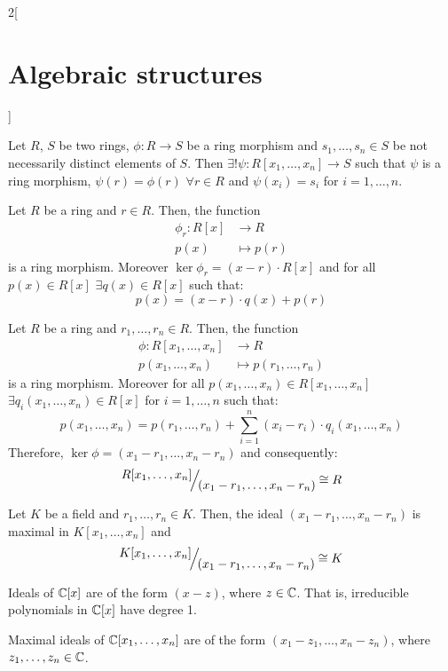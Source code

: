 \documentclass[../../../main.tex]{subfiles}
\begin{document}
\begin{multicols}{2}[\section{Algebraic structures}]
\begin{prop}
  \end{prop}
  \begin{prop}
    Let $R$, $S$ be two rings, $\phi:R\rightarrow S$ be a ring morphism and $s_1,\ldots,s_n\in S$ be not necessarily distinct elements of $S$. Then $\exists!\psi:R[x_1,\ldots,x_n]\rightarrow S$ such that $\psi$ is a ring morphism, $\psi(r)=\phi(r)$ $\forall r\in R$ and $\psi(x_i)=s_i$ for $i=1,\ldots,n$.
  \end{prop}
  \begin{corollary}
    Let $R$ be a ring and $r\in R$. Then, the function
    \begin{align*}
      \phi_r:R[x] & \longrightarrow R \\
      p(x)        & \longmapsto p(r)
    \end{align*}
    is a ring morphism. Moreover $\ker\phi_r=(x-r)\cdot R[x]$ and for all $p(x)\in R[x]$ $\exists q(x)\in R[x]$ such that: $$p(x)=(x-r)\cdot q(x)+p(r)$$
  \end{corollary}
  \begin{corollary}
    Let $R$ be a ring and $r_1,\ldots,r_n\in R$. Then, the function
    \begin{align*}
      \phi:R[x_1,\ldots,x_n] & \longrightarrow R             \\
      p(x_1,\ldots,x_n)      & \longmapsto p(r_1,\ldots,r_n)
    \end{align*}
    is a ring morphism. Moreover for all $p(x_1,\ldots,x_n)\in R[x_1,\ldots,x_n]$ $\exists q_i(x_1,\ldots,x_n)\in R[x]$ for $i=1,\ldots,n$ such that: $$p(x_1,\ldots,x_n)=p(r_1,\ldots,r_n)+\sum_{i=1}^n(x_i-r_i)\cdot q_i(x_1,\ldots,x_n)$$ Therefore, $\ker\phi=(x_1-r_1,\ldots,x_n-r_n)$ and consequently: $$\quot{R[x_1,\ldots,x_n]}{(x_1-r_1,\ldots,x_n-r_n)}\cong R$$
  \end{corollary}
  \begin{corollary}
    Let $K$ be a field and $r_1,\ldots,r_n\in K$. Then, the ideal $(x_1-r_1,\ldots,x_n-r_n)$ is maximal in $K[x_1,\ldots,x_n]$ and $$\quot{K[x_1,\ldots,x_n]}{(x_1-r_1,\ldots,x_n-r_n)}\cong K$$
  \end{corollary}
  \begin{theorem}
    Ideals of $\mathbb{C}[x]$ are of the form $(x-z)$, where $z\in\mathbb{C}$. That is, irreducible polynomials in $\mathbb{C}[x]$ have degree 1.
  \end{theorem}
  \begin{theorem}
    Maximal ideals of $\mathbb{C}[x_1,\ldots,x_n]$ are of the form $(x_1-z_1,\ldots,x_n-z_n)$, where $z_1,\ldots,z_n\in\mathbb{C}$.

\end{theorem}
\end{multicols}
\end{document}
